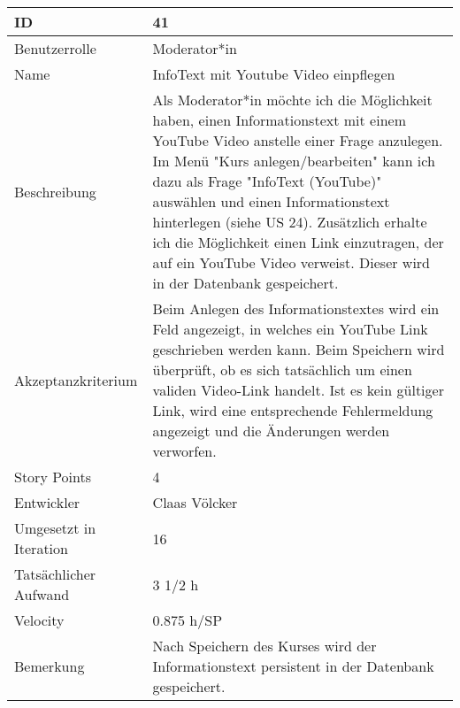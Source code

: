 \begin{tabularx}{\textwidth}{|p{}|X|}
	\hline
	ID & 41\\
	\hline
	Benutzerrolle & Moderator*in\\
	\hline
	Name & InfoText mit Youtube Video einpflegen\\
	\hline
	Beschreibung & Als Moderator*in möchte ich die Möglichkeit haben, einen Informationstext mit einem YouTube Video anstelle einer Frage anzulegen. Im Menü "Kurs anlegen/bearbeiten" kann ich dazu als Frage "InfoText (YouTube)" auswählen und einen Informationstext hinterlegen (siehe US 24). Zusätzlich erhalte ich die Möglichkeit einen Link einzutragen, der auf ein YouTube Video verweist. Dieser wird in der Datenbank gespeichert.\\
	\hline
	Akzeptanzkriterium & Beim Anlegen des Informationstextes wird ein Feld angezeigt, in welches ein YouTube Link geschrieben werden kann. Beim Speichern wird überprüft, ob es sich tatsächlich um einen validen Video-Link handelt. Ist es kein gültiger Link, wird eine entsprechende Fehlermeldung angezeigt und die Änderungen werden verworfen. \\
	\hline
	Story Points & 4\\
	\hline
	Entwickler & Claas Völcker\\
	\hline
	Umgesetzt in Iteration & 16\\
	\hline
	Tatsächlicher Aufwand & 3 1/2 h\\
	\hline
	Velocity & 0.875 h/SP\\
	\hline
	Bemerkung & Nach Speichern des Kurses wird der Informationstext persistent in der Datenbank gespeichert.\\
	\hline
\end{tabularx}
\vspace{20pt}
